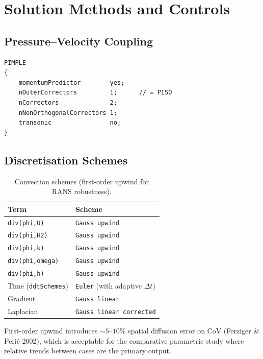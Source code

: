 \documentclass[12pt,a4paper]{report}
\begin{document}
\chapter{Solution Methods and Controls}
\label{ch:solution}

\section{Pressure--Velocity Coupling}

\begin{lstlisting}[language={},title=system/fvSolution (PIMPLE block)]
PIMPLE
{
    momentumPredictor        yes;
    nOuterCorrectors         1;      // = PISO
    nCorrectors              2;
    nNonOrthogonalCorrectors 1;
    transonic                no;
}
\end{lstlisting}


\section{Discretisation Schemes}

\begin{table}[H]
\centering
\caption{Convection schemes (first-order upwind for RANS robustness).}
\label{tab:divschemes}
\begin{tabularx}{\textwidth}{@{}lX@{}}
\toprule
\textbf{Term} & \textbf{Scheme} \\
\midrule
\texttt{div(phi,U)}       & \texttt{Gauss upwind} \\
\texttt{div(phi,H2)}      & \texttt{Gauss upwind} \\
\texttt{div(phi,k)}       & \texttt{Gauss upwind} \\
\texttt{div(phi,omega)}   & \texttt{Gauss upwind} \\
\texttt{div(phi,h)}       & \texttt{Gauss upwind} \\
Time (\texttt{ddtSchemes}) & \texttt{Euler} (with adaptive $\Delta t$) \\
Gradient                   & \texttt{Gauss linear} \\
Laplacian                  & \texttt{Gauss linear corrected} \\
\bottomrule
\end{tabularx}
\end{table}

\noindent First-order upwind introduces $\sim 5$--$10\%$ spatial
diffusion error on CoV (Ferziger \& Peri\'{c} 2002), which is
acceptable for the comparative parametric study where relative trends
between cases are the primary output.
\end{document}
